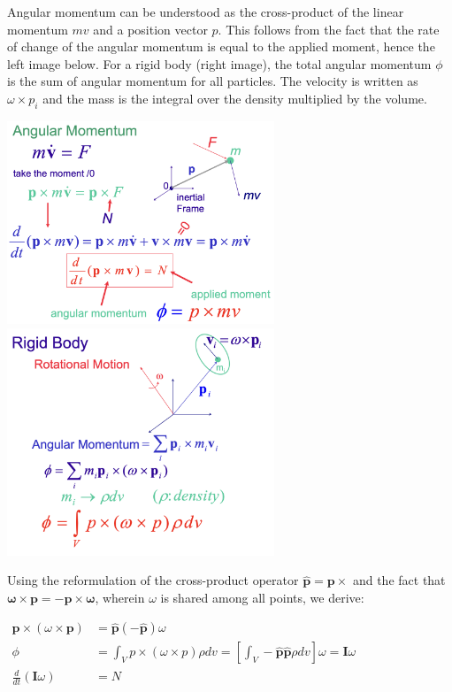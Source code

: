 Angular momentum can be understood as the cross-product of the linear momentum $mv$ and a position vector $p$. This follows from the fact that the rate of change of the angular momentum is equal to the applied moment, hence the left image below. For a rigid body (right image), the total angular momentum $\phi$ is the sum of angular momentum for all particles. The velocity is written as $\omega \times p_i$ and the mass is the integral over the density multiplied by the volume.
\begin{center}
	\includegraphics[width=8cm]{sections/imgs/6_angular_momentum.png}
	\hfill
	\includegraphics[width=8cm]{sections/imgs/6_rigid_body_angular_momentum.png}
\end{center}

Using the reformulation of the cross-product operator $\mathbf{\hat{p}}=\mathbf{p}\times$ and the fact that $\mathbf{\omega}\times\mathbf{p}=-\mathbf{p}\times\mathbf{\omega}$, wherein $\omega$ is shared among all points, we derive:

\begin{center}
$\begin{aligned}
	\mathbf{p} \times(\omega \times \mathbf{p})&=\hat{\mathbf{p}}(-\hat{\mathbf{p}}) \omega \\
	\phi &= \int_{V} p \times(\omega \times p) \rho d v = \left[\int_{V} -\hat{\mathbf{p}} \hat{\mathbf{p}} \rho d v\right] \omega = \mathbf{I}\omega \\
	\frac{d}{d t}(\mathbf{I} \omega)&=N
\end{aligned}$
\end{center}

